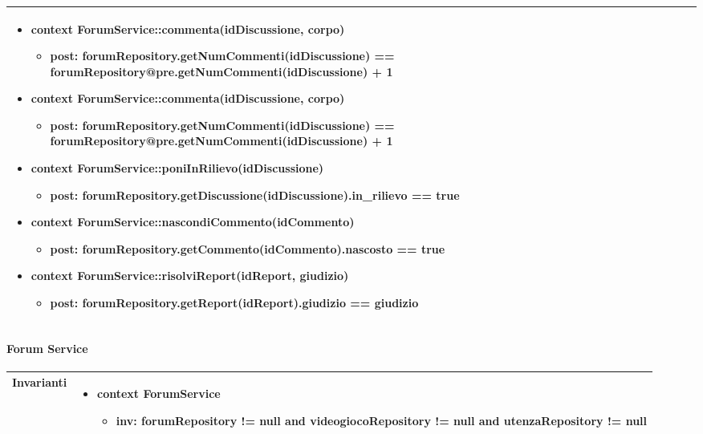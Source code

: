 \begin{tabular}{|| l | p{28em} ||}
\begin{itemize}[leftmargin=*]
		\item \textbf{context} ForumService::commenta(idDiscussione, corpo)
		\begin{itemize}
			\item[ ] \textbf{post:} forumRepository.getNumCommenti(idDiscussione) == forumRepository@pre.getNumCommenti(idDiscussione) + 1
		\end{itemize}

		\item \textbf{context} ForumService::commenta(idDiscussione, corpo)
		\begin{itemize}
			\item[ ] \textbf{post:} forumRepository.getNumCommenti(idDiscussione) == forumRepository@pre.getNumCommenti(idDiscussione) + 1
		\end{itemize}

		\item \textbf{context} ForumService::poniInRilievo(idDiscussione)
		\begin{itemize}
			\item[ ] \textbf{post:} forumRepository.getDiscussione(idDiscussione).in\_rilievo == true
		\end{itemize}

		\item \textbf{context} ForumService::nascondiCommento(idCommento)
		\begin{itemize}
			\item[ ] \textbf{post:} forumRepository.getCommento(idCommento).nascosto == true
		\end{itemize}

		\item \textbf{context} ForumService::risolviReport(idReport, giudizio)
		\begin{itemize}
			\item[ ] \textbf{post:} forumRepository.getReport(idReport).giudizio == giudizio
		\end{itemize}
	\end{itemize}\\
	\hline
\end{tabular}

\newpage
\paragraph{Forum Service}
\small\begin{tabular}{|| l | p{28em} ||} 
	\hline
	Invarianti & \begin{itemize}
		\item \textbf{context} ForumService
		\begin{itemize}
			\item[ ] \textbf{inv:} forumRepository != null and  videogiocoRepository != null and utenzaRepository != null
		\end{itemize}
	\end{itemize}\\
	\hline
\end{tabular}

